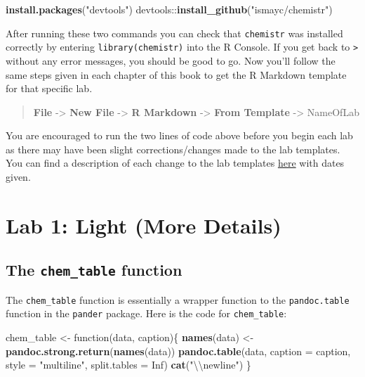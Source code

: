 \documentclass[]{tufte-book}
\newenvironment{Shaded}{\begin{snugshade}}{\end{snugshade}}
\newcommand{\KeywordTok}[1]{\textcolor[rgb]{0.13,0.29,0.53}{\textbf{{#1}}}}
\newcommand{\DataTypeTok}[1]{\textcolor[rgb]{0.13,0.29,0.53}{{#1}}}
\newcommand{\CharTok}[1]{\textcolor[rgb]{0.31,0.60,0.02}{{#1}}}
\newcommand{\StringTok}[1]{\textcolor[rgb]{0.31,0.60,0.02}{{#1}}}
\newcommand{\OtherTok}[1]{\textcolor[rgb]{0.56,0.35,0.01}{{#1}}}
\newcommand{\NormalTok}[1]{{#1}}
\begin{document}
\begin{Shaded}
\begin{Highlighting}[]
\KeywordTok{install.packages}\NormalTok{(}\StringTok{"devtools"}\NormalTok{)}
\NormalTok{devtools::}\KeywordTok{install_github}\NormalTok{(}\StringTok{"ismayc/chemistr"}\NormalTok{)}
\end{Highlighting}
\end{Shaded}

After running these two commands you can check that \texttt{chemistr}
was installed correctly by entering \texttt{library(chemistr)} into the
R Console. If you get back to \texttt{\textgreater{}} without any error
messages, you should be good to go. Now you'll follow the same steps
given in each chapter of this book to get the R Markdown template for
that specific lab.

\begin{quote}
\textbf{File} -\textgreater{} \textbf{New File} -\textgreater{}
\textbf{R Markdown} -\textgreater{} \textbf{From Template}
-\textgreater{} NameOfLab
\end{quote}

You are encouraged to run the two lines of code above before you begin
each lab as there may have been slight corrections/changes made to the
lab templates. You can find a description of each change to the lab
templates
\href{https://github.com/ismayc/chemistr/blob/master/NEWS.md}{here} with
dates given.

\chapter{Lab 1: Light (More Details)}\label{appendix-light}

\section{\texorpdfstring{The \texttt{chem\_table}
function}{The chem\_table function}}\label{the-chemux5ftable-function}

The \texttt{chem\_table} function is essentially a wrapper function to
the \texttt{pandoc.table} function in the \texttt{pander} package. Here
is the code for \texttt{chem\_table}:

\begin{Shaded}
\begin{Highlighting}[]
\NormalTok{chem_table <-}\StringTok{ }\NormalTok{function(data, caption)\{}
  \KeywordTok{names}\NormalTok{(data) <-}\StringTok{ }\KeywordTok{pandoc.strong.return}\NormalTok{(}\KeywordTok{names}\NormalTok{(data))}
  \KeywordTok{pandoc.table}\NormalTok{(data, }\DataTypeTok{caption =} \NormalTok{caption, }\DataTypeTok{style =} \StringTok{"multiline"}\NormalTok{,}
               \DataTypeTok{split.tables =} \OtherTok{Inf}\NormalTok{)}
  \KeywordTok{cat}\NormalTok{(}\StringTok{"}\CharTok{\textbackslash{}\textbackslash{}}\StringTok{newline"}\NormalTok{)}
\NormalTok{\}}
\end{Highlighting}
\end{Shaded}
\end{document}

